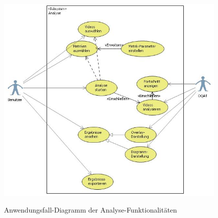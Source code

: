 \begin{figure}[h]
\includegraphics[scale=1]{bilder/anwendungsfalldiagramm_analyse.jpg}
\label{Anwendungsfalldiagramm_Analyse}
\caption{Anwendungsfall-Diagramm der Analyse-Funktionalitäten}
\end{figure}


%
%
%
%
%

